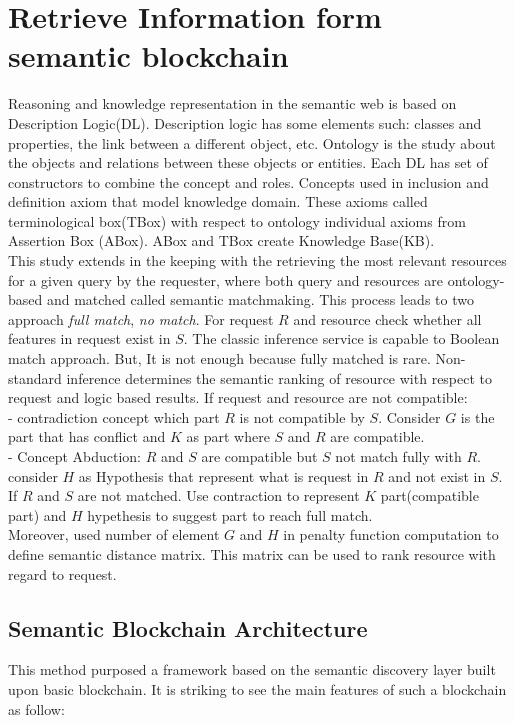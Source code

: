 \section{Retrieve Information form semantic blockchain}
Reasoning and knowledge representation in the semantic web is based on Description Logic(DL). Description logic has some elements such: classes and properties, the link between a different object, etc. Ontology is the study about the objects and relations between these objects or entities.
Each DL has set of constructors to combine the concept and roles.
Concepts used in inclusion and definition axiom that model knowledge domain. These axioms called terminological box(TBox) with respect to ontology individual axioms from Assertion Box (ABox). ABox and TBox create Knowledge Base(KB). \\
This study extends in the keeping with the retrieving the most relevant resources for a given query by the requester, where both query and resources are ontology-based and matched called semantic matchmaking. This process leads to two approach \textit{full match}, \textit{no match}. 
For request $R$ and resource check whether all features in request exist in $S$.
The classic inference service is capable to Boolean match approach.
But, It is not enough because fully matched is rare. Non-standard inference determines the semantic ranking of resource with respect to request and logic based results.
If request and resource are not compatible:\\
-  contradiction concept which part $R$ is not compatible by $S$. Consider $G$ is the part that has conflict and $K$ as part where $S$ and $R$ are compatible.\\
- Concept Abduction: $R$ and $S$ are compatible but $S$ not match fully with $R$.
consider $H$ as Hypothesis that represent what is request in $R$ and not exist in $S$.
If $R$ and $S$ are not matched. Use contraction to represent $K$ part(compatible part) and $H$ hypethesis to suggest part to reach full match.\\
Moreover, used number of element $G$ and $H$ in penalty function computation to define semantic distance matrix.
This matrix can be used to rank resource with regard to request\cite{Ruta}. 

\subsection{Semantic Blockchain Architecture} 
This method purposed a framework based on the semantic discovery layer built upon basic blockchain. It is striking to see the main features of such a blockchain as follow:

